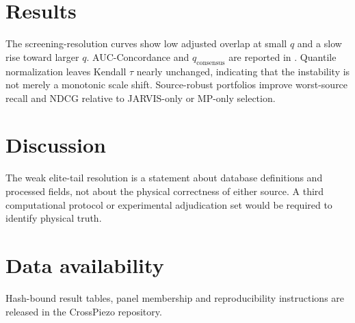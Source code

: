 \documentclass[11pt]{article}
\begin{document}
\section{Results}
The screening-resolution curves show low adjusted overlap at small $q$ and a slow rise toward larger $q$.
AUC-Concordance and $q_\text{consensus}$ are reported in .
Quantile normalization leaves Kendall $\tau$ nearly unchanged, indicating that the instability is not merely a monotonic scale shift.
Source-robust portfolios improve worst-source recall and NDCG relative to JARVIS-only or MP-only selection.
\section{Discussion}
The weak elite-tail resolution is a statement about database definitions and processed fields, not about the physical correctness of either source.
A third computational protocol or experimental adjudication set would be required to identify physical truth.
\section{Data availability}
Hash-bound result tables, panel membership and reproducibility instructions are released in the CrossPiezo repository.


\end{document}
